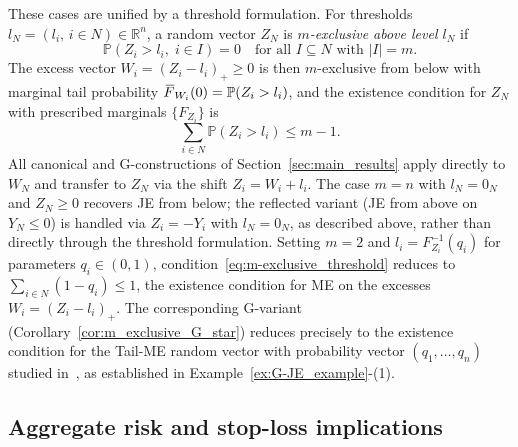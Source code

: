 \documentclass[letterpaper,12pt]{article}
\def \P {\mathbb{P}}
\numberwithin{equation}{section}
\newcommand{\N}{{N}}
\newcommand{\F}{\,\overline{\kern-0.175em F\kern-0em}}
\begin{document}
{These cases are unified by a threshold formulation. For thresholds
$l_\N=(l_i,\,i\in\N)\in\mathbb{R}^n$, a random vector $Z_\N$ is
\emph{$m$-exclusive above level $l_\N$} if
\[
\P(Z_i>l_i,\;i\in I)=0
\quad\text{for all }I\subseteq\N\text{ with }|I|=m.
\]
The excess vector $W_i=(Z_i-l_i)_+\ge0$ is then $m$-exclusive from below
with marginal tail probability $\F_{W_i}(0)=\P(Z_i>l_i)$, and the
existence condition for $Z_\N$ with prescribed marginals $\{F_{Z_i}\}$ is
\begin{equation}
\label{eq:m-exclusive_threshold}
\sum_{i\in\N}\P(Z_i>l_i)\le m-1.
\end{equation}
All canonical and G-constructions of Section~\ref{sec:main_results} apply
directly to $W_\N$ and transfer to $Z_\N$ via the shift $Z_i=W_i+l_i$.
The case $m=n$ with $l_\N=0_\N$ and $Z_\N\ge0$ recovers JE from below; the
reflected variant (JE from above on $Y_\N\le0$) is handled via $Z_i=-Y_i$
with $l_\N=0_\N$, as described above, rather than directly through the
threshold formulation. Setting $m=2$ and $l_i=F_{Z_i}^{-1}(q_i)$ for
parameters $q_i\in(0,1)$, condition~\eqref{eq:m-exclusive_threshold} reduces
to $\sum_{i\in\N}(1-q_i)\le1$, the existence condition for ME on the excesses
$W_i=(Z_i-l_i)_+$. The corresponding G-variant
(Corollary~\ref{cor:m_exclusive_G_star}) reduces precisely to the existence
condition for the Tail-ME random vector with probability vector
$(q_1,\dots,q_n)$ studied in~\cite{Cheung2017}, as established in
Example~\ref{ex:G-JE_example}-(1).

\subsection{Aggregate risk and stop-loss implications}
\label{subsec:aggregate}

}
\end{document}
